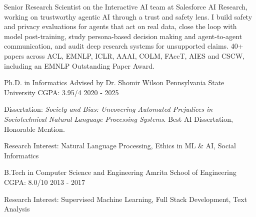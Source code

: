 \documentclass[11pt, letterpaper]{awesome-cv}
\begin{document}
\makecvheader[C]


\begin{cvparagraph}
Senior Research Scientist on the Interactive AI team at Salesforce AI Research, working on trustworthy agentic AI through a trust and safety lens. I build safety and privacy evaluations for agents that act on real data, close the loop with model post-training, study persona-based decision making and agent-to-agent communication, and audit deep research systems for unsupported claims. 40+ papers across ACL, EMNLP, ICLR, AAAI, COLM, FAccT, AIES and CSCW, including an EMNLP Outstanding Paper Award.
\end{cvparagraph}


\begin{cventries}
  \cventry
    {Ph.D. in Informatics \textbar{} Advised by Dr. Shomir Wilson}
    {Pennsylvania State University}
    {CGPA: 3.95/4}
    {2020 - 2025}
    {
      \begin{cvitems}
        \item {Dissertation: \textit{Society and Bias: Uncovering Automated Prejudices in Sociotechnical Natural Language Processing Systems}. Best AI Dissertation, Honorable Mention.}
        \item {Research Interest: Natural Language Processing, Ethics in ML \& AI, Social Informatics}
      \end{cvitems}
    }%
  \cventry
    {B.Tech in Computer Science and Engineering}
    {Amrita School of Engineering}
    {CGPA: 8.0/10}
    {2013 - 2017}
    {
      \begin{cvitems}
        \item {Research Interest: Supervised Machine Learning, Full Stack Development, Text Analysis}
      \end{cvitems}
    }%
\end{cventries}

\end{document}
